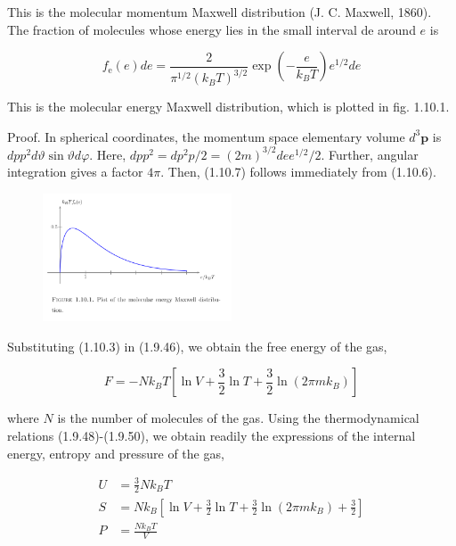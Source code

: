 \documentclass{article}
\begin{document}
This is the molecular momentum Maxwell distribution (J. C. Maxwell, 1860). The fraction of molecules whose energy lies in the small interval de around $e$ is
 
\begin{equation*}
f_{\mathrm{e}}(e) d e=\frac{2}{\pi^{1 / 2}\left(k_{B} T\right)^{3 / 2}} \exp \left(-\frac{e}{k_{B} T}\right) e^{1 / 2} d e \tag{1.10.7}
\end{equation*}
 

This is the molecular energy Maxwell distribution, which is plotted in fig. 1.10.1.

Proof. In spherical coordinates, the momentum space elementary volume $d^{3} \boldsymbol{p}$ is $d p p^{2} d \vartheta \sin \vartheta d \varphi$. Here, $d p p^{2}=d p^{2} p / 2=(2 m)^{3 / 2} d e e^{1 / 2} / 2$. Further, angular integration gives a factor $4 \pi$. Then, (1.10.7) follows immediately from (1.10.6).

\begin{figure}[h!]
    \centering
    \includegraphics[width=0.5\textwidth]{pictures_1/fig 1.10.1.png}
    \label{fig:1.9.1}
\end{figure}

Substituting (1.10.3) in (1.9.46), we obtain the free energy of the gas,
 
\begin{equation*}
F=-N k_{B} T\left[\ln V+\frac{3}{2} \ln T+\frac{3}{2} \ln \left(2 \pi m k_{B}\right)\right] \tag{1.10.8}
\end{equation*}
 
where $N$ is the number of molecules of the gas. Using the thermodynamical relations (1.9.48)-(1.9.50), we obtain readily the expressions of the internal energy, entropy and pressure of the gas,
 
\begin{align*}
U & =\frac{3}{2} N k_{B} T  \tag{1.10.9}\\
S & =N k_{B}\left[\ln V+\frac{3}{2} \ln T+\frac{3}{2} \ln \left(2 \pi m k_{B}\right)+\frac{3}{2}\right]  \tag{1.10.10}\\
P & =\frac{N k_{B} T}{V} \tag{1.10.11}
\end{align*}
 
\end{document}

